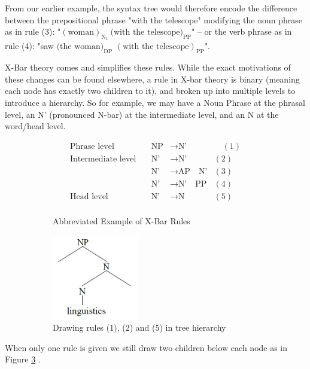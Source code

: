 \documentclass[runningheads]{llncs}
\begin{document}
From our earlier example, the syntax tree would therefore encode the difference between the prepositional phrase "with the telescope" modifying the noun phrase as in rule (3): "$(\text{woman})_{\text{N}_1}\ \text{(with the telescope)}_{\text{PP}}$" -- or the verb phrase as in rule (4): "saw $\text{(the woman)}_{\text{DP}}$ $(\text{with the telescope})_{\text{PP}}$".

X-Bar theory comes and simplifies these rules. While the exact motivations of these changes can be found elsewhere, %
a rule in X-bar theory is binary (meaning each node has exactly two children to it), and broken up into multiple levels to introduce a hierarchy. So for example, we may have a Noun Phrase at the phrasal level, an N' (pronounced N-bar) at the intermediate level, and an N at the word/head level.

\begin{figure}
	\centering
	\begin{subfigure}[b]{0.45\textwidth}
    \[
		\begin{array}{rllr}
			\text{Phrase level}\quad  &\text{NP}  &\rightarrow \text{N'}&\quad (1)\\
			\text{Intermediate level}\quad&\text{N'}  &\rightarrow \text{N'}&(2)\\
																		&\text{N'}  &\rightarrow \text{AP} \quad \text{N'}&(3)\\
																		&\text{N'}  &\rightarrow \text{N'} \quad \text{PP}&(4)\\
			\text{Head level}\quad&\text{N'}  &\rightarrow \text{N}&(5)\\
    \end{array}
	\]
    \caption{Abbreviated Example of X-Bar Rules}
		\label{fig:xbar}
	\end{subfigure}
	\begin{subfigure}[b]{0.45\textwidth}
		\centering
		\includegraphics[height=10em]{nouns}
		\caption{Drawing rules (1), (2) and (5) in tree hierarchy}
		\label{fig:nouns-img}
	\end{subfigure}
	\caption{}
\end{figure}
When only one rule is given we still draw two children below each node as in Figure \ref{fig:nouns-img} .
\end{document}
